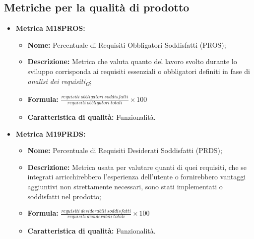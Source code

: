 \subsection{Metriche per la qualità di prodotto}
\begin{itemize}
    
    \vspace{0.4cm}
    \item \hypertarget{item:M18PROS}{\textbf{Metrica M18PROS:}}
    \vspace{0.2cm}
    
    \begin{minipage}[H]{0.9\textwidth}
        \begin{itemize}
            \item \textbf{Nome:} Percentuale di Requisiti Obbligatori Soddisfatti (PROS);
            \item \textbf{Descrizione:} Metrica che valuta quanto del lavoro svolto durante lo sviluppo corrisponda ai requisiti essenziali o obbligatori definiti in fase di \textit{analisi dei requisiti}\textsubscript{\textit{G}};
            \item \textbf{Formula:} $\frac{requisiti \ obbligatori \ soddisfatti}{requisiti \ obbligatori \ totali}\times 100$
            \item \textbf{Caratteristica di qualità:} Funzionalità.
        \end{itemize}
    \end{minipage}

    \vspace{0.4cm}
    \item \hypertarget{item:M19PRDS}{\textbf{Metrica M19PRDS:}}
    \vspace{0.2cm}
    
    \begin{minipage}[H]{0.9\textwidth}
        \begin{itemize}
            \item \textbf{Nome:} Percentuale di Requisiti Desiderati Soddisfatti (PRDS);
            \item \textbf{Descrizione:} Metrica usata per valutare quanti di quei requisiti, che se integrati arricchirebbero l'esperienza dell'utente o fornirebbero vantaggi aggiuntivi non strettamente necessari, sono stati implementati o soddisfatti nel prodotto;
            \item \textbf{Formula:} $\frac{requisiti \ desiderabili \ soddisfatti}{requisiti \ desiderabili \ totali}\times 100$
            \item \textbf{Caratteristica di qualità:} Funzionalità.
        \end{itemize}
    \end{minipage}


\end{itemize}
